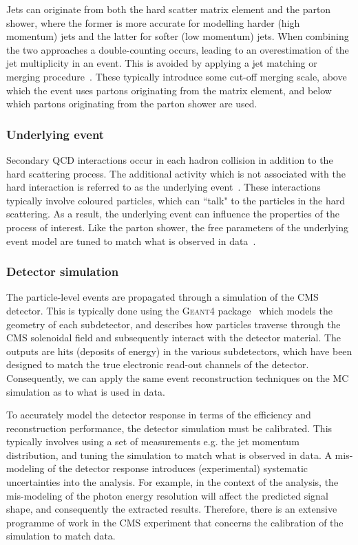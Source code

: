 Jets can originate from both the hard scatter matrix element and the parton shower, where the former is more accurate for modelling harder (high momentum) jets and the latter for softer (low momentum) jets. When combining the two approaches a double-counting occurs, leading to an overestimation of the jet multiplicity in an event. This is avoided by applying a jet matching or merging procedure~\cite{Alwall:2007fs}. These typically introduce some cut-off merging scale, above which the event uses partons originating from the matrix element, and below which partons originating from the parton shower are used.

\subsubsection{Underlying event}
Secondary QCD interactions occur in each hadron collision in addition to the hard scattering process. The additional activity which is not associated with the hard interaction is referred to as the underlying event~\cite{}. These interactions typically involve coloured particles, which can ``talk" to the particles in the hard scattering. As a result, the underlying event can influence the properties of the process of interest. Like the parton shower, the free parameters of the underlying event model are tuned to match what is observed in data~\cite{}. 

\subsubsection{Detector simulation}
The particle-level events are propagated through a simulation of the CMS detector. This is typically done using the \textsc{Geant4} package~\cite{} which models the geometry of each subdetector, and describes how particles traverse through the CMS solenoidal field and subsequently interact with the detector material. The outputs are hits (deposits of energy) in the various subdetectors, which have been designed to match the true electronic read-out channels of the detector. Consequently, we can apply the same event reconstruction techniques on the MC simulation as to what is used in data. 

To accurately model the detector response in terms of the efficiency and reconstruction performance, the detector simulation must be calibrated. This typically involves using a set of measurements e.g. the jet momentum distribution, and tuning the simulation to match what is observed in data. A mis-modeling of the detector response introduces (experimental) systematic uncertainties into the analysis. For example, in the context of the \Hgg analysis, the mis-modeling of the photon energy resolution will affect the predicted signal shape, and consequently the extracted results. Therefore, there is an extensive programme of work in the CMS experiment that concerns the calibration of the simulation to match data.

